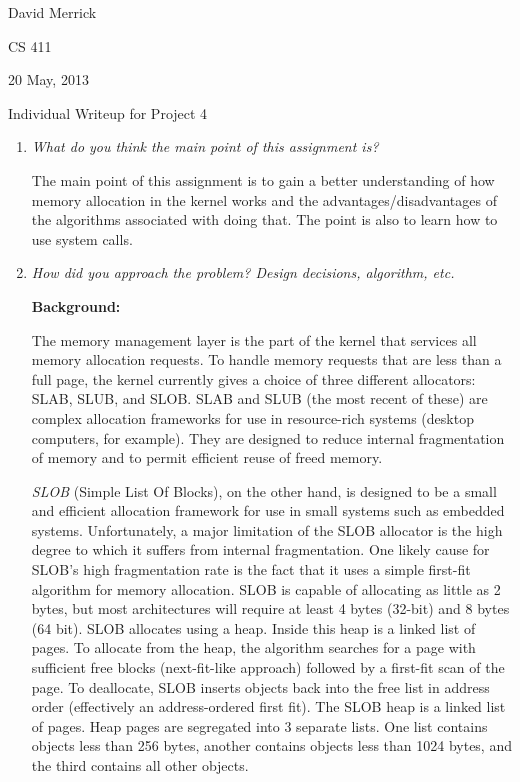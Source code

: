 \documentclass[letterpaper,10pt,titlepage]{article}
\newcommand{\tab}{\hspace*{2em}} %
\def\name{David Merrick}
\def\project{Project 4}
\def\date{20 May, 2013}
\begin{document}
\name

CS 411

\date

\begin{center}
{\LARGE Individual Writeup for \project}
\end{center}

\begin{enumerate} 
\item \emph{What do you think the main point of this assignment is?}

\tab The main point of this assignment is to gain a better understanding of how memory allocation in the kernel works and the advantages/disadvantages of the algorithms associated with doing that. The point is also to learn how to use system calls.

\item \emph{How did you approach the problem? Design decisions, algorithm, etc.}\newline

\textbf{Background:} 

\tab The memory management layer is the part of the kernel that services all memory allocation requests. To handle memory requests that are less than a full page, the kernel currently gives a choice of three different allocators: SLAB, SLUB, and SLOB. SLAB and SLUB (the most recent of these) are complex allocation frameworks for use in resource-rich systems (desktop computers, for example). They are designed to reduce internal fragmentation of memory and to permit efficient reuse of freed memory. 

\tab\emph{SLOB} (Simple List Of Blocks), on the other hand, is designed to be a small and efficient allocation framework for use in small systems such as embedded systems. Unfortunately, a major limitation of the SLOB allocator is the high degree to which it suffers from internal fragmentation. One likely cause for SLOB's high fragmentation rate is the fact that it uses a simple first-fit algorithm for memory allocation. SLOB is capable of allocating as little as 2 bytes, but most architectures will require at least 4 bytes (32-bit) and 8 bytes (64 bit). SLOB allocates using a heap. Inside this heap is a linked list of pages. To allocate from the heap, the algorithm searches for a page with sufficient free blocks (next-fit-like approach) followed by a first-fit scan of the page. To deallocate, SLOB inserts objects back into the free list in address order (effectively an address-ordered first fit). The SLOB heap is a linked list of pages. Heap pages are segregated into 3 separate lists. One list contains objects less than 256 bytes, another contains objects less than 1024 bytes, and the third contains all other objects. 


\end{enumerate}
\end{document}
